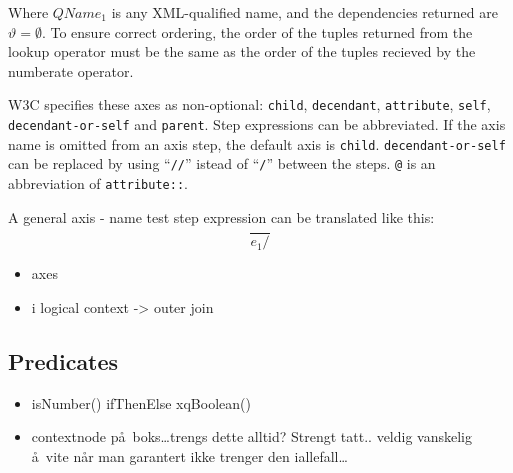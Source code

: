 Where $QName_1$ is any XML-qualified name, and the dependencies returned are $\vartheta = \emptyset$. To ensure
correct ordering, the order of the tuples returned from the \textsf{lookup} operator must be the same as the order
of the tuples recieved by the \textsf{numberate} operator. 

W3C specifies these axes as non-optional: \texttt{child}, \texttt{decendant}, \texttt{attribute},
\texttt{self}, \texttt{decendant-or-self} and \texttt{parent}. Step expressions can be abbreviated. If the axis
name is omitted from an axis step, the default axis is \texttt{child}. \texttt{decendant-or-self} can be replaced
by using ``\texttt{//}'' istead of ``\texttt{/}'' between the steps. \texttt{@} is an abbreviation of
\texttt{attribute::}.

A general axis - name test step expression can be translated like this:
\begin{equation}
\frac{}{e_{1}\texttt{/}}
\end{equation}




\begin{itemize}
  \item axes
  
  \item i logical context -> outer join
\end{itemize}

\subsection{Predicates}
\label{sect:trans:TD:predicates}
\begin{itemize}
  \item isNumber() ifThenElse xqBoolean()
  \item contextnode p\aa~boks\ldots trengs dette alltid? Strengt tatt.. veldig vanskelig \aa~vite n\aa r man
  garantert ikke trenger den iallefall\ldots
\end{itemize}
